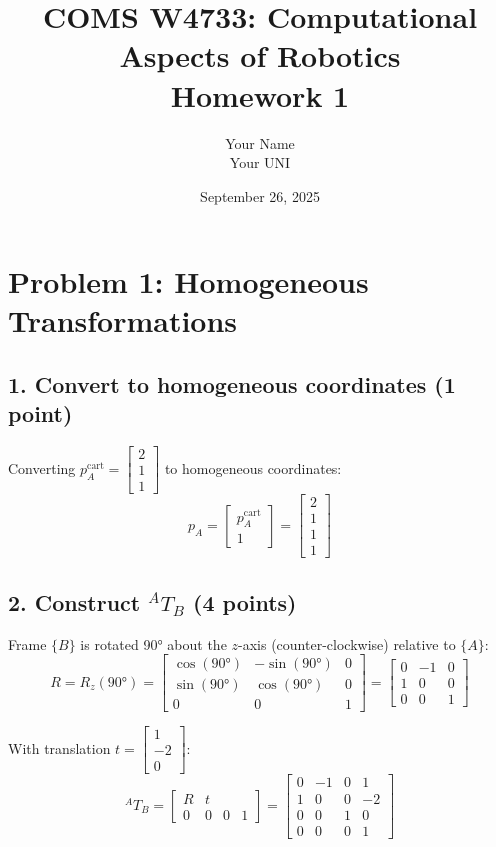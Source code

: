 \documentclass[11pt]{article}
\title{COMS W4733: Computational Aspects of Robotics\\Homework 1}
\author{Your Name \\ Your UNI}
\date{September 26, 2025}
\begin{document}
\maketitle

\section*{Problem 1: Homogeneous Transformations}

\subsection*{1. Convert to homogeneous coordinates (1 point)}
Converting $p_A^{\text{cart}} = \begin{bmatrix} 2 \\ 1 \\ 1 \end{bmatrix}$ to homogeneous coordinates:
$$p_A = \begin{bmatrix} p_A^{\text{cart}} \\ 1 \end{bmatrix} = \begin{bmatrix} 2 \\ 1 \\ 1 \\ 1 \end{bmatrix}$$

\subsection*{2. Construct $^A T_B$ (4 points)}
Frame $\{B\}$ is rotated 90° about the $z$-axis (counter-clockwise) relative to $\{A\}$:
$$R = R_z(90°) = \begin{bmatrix} 
\cos(90°) & -\sin(90°) & 0 \\
\sin(90°) & \cos(90°) & 0 \\
0 & 0 & 1
\end{bmatrix} = \begin{bmatrix}
0 & -1 & 0 \\
1 & 0 & 0 \\
0 & 0 & 1
\end{bmatrix}$$

With translation $t = \begin{bmatrix} 1 \\ -2 \\ 0 \end{bmatrix}$:
$$^A T_B = \begin{bmatrix}
R & t \\
0 & 0 & 0 & 1
\end{bmatrix} = \begin{bmatrix}
0 & -1 & 0 & 1 \\
1 & 0 & 0 & -2 \\
0 & 0 & 1 & 0 \\
0 & 0 & 0 & 1
\end{bmatrix}$$
\end{document}
